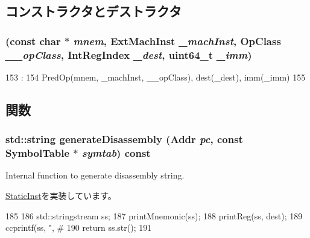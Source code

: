 \subsection{コンストラクタとデストラクタ}
\hypertarget{classRegImmOp_a6670b35e53e6a4257fd6c0ebd586ab5e}{
\subsubsection[{RegImmOp}]{ (const char $\ast$ {\em mnem}, \/  {\bf ExtMachInst} {\em \_\-machInst}, \/  OpClass {\em \_\-\_\-opClass}, \/  {\bf IntRegIndex} {\em \_\-dest}, \/  uint64\_\-t {\em \_\-imm})}}
\label{classRegImmOp_a6670b35e53e6a4257fd6c0ebd586ab5e}



\begin{DoxyCode}
153                                                :
154         PredOp(mnem, _machInst, __opClass), dest(_dest), imm(_imm)
155     {}

\end{DoxyCode}


\subsection{関数}
\hypertarget{classRegImmOp_a95d323a22a5f07e14d6b4c9385a91896}{
\subsubsection[{generateDisassembly}]{\setlength{\rightskip}{0pt plus 5cm}std::string generateDisassembly ({\bf Addr} {\em pc}, \/  const SymbolTable $\ast$ {\em symtab}) const}}
\label{classRegImmOp_a95d323a22a5f07e14d6b4c9385a91896}
Internal function to generate disassembly string. 

\hyperlink{classStaticInst_ab4a569d2623620c04f8a52bbd91d63b9}{StaticInst}を実装しています。


\begin{DoxyCode}
185 {
186     std::stringstream ss;
187     printMnemonic(ss);
188     printReg(ss, dest);
189     ccprintf(ss, ", #%
190     return ss.str();
191 }
\end{DoxyCode}


